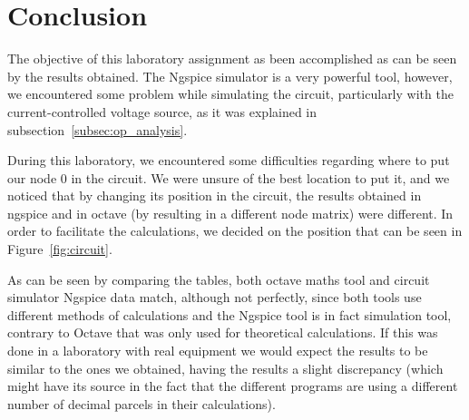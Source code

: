 \section{Conclusion}
\label{sec:conclusion}

\tab The objective of this laboratory assignment as been accomplished as can be seen by the results obtained. The Ngspice simulator is a very powerful tool, however, we encountered some problem while simulating the circuit, particularly with the current-controlled voltage source, as it was explained in subsection~\ref{subsec:op_analysis}.\par
During this laboratory, we encountered some difficulties regarding where to put our node 0 in the circuit. We were unsure of the best location to put it, and we noticed that by changing its position in the circuit, the results obtained in ngspice and in octave (by resulting in a different node matrix) were different. In order to facilitate the calculations, we decided on the position that can be seen in Figure~\ref{fig:circuit}.\par
As can be seen by comparing the tables, both octave maths tool and circuit simulator Ngspice data match, although not perfectly, since both tools use different methods of calculations and the Ngspice tool is in fact simulation tool, contrary to Octave that was only used for theoretical calculations. If this was done in a laboratory with real equipment we would expect the results to be similar to the ones we obtained, having the results a slight discrepancy (which might have its source in the fact that the different programs are using a different number of decimal parcels in their calculations).

